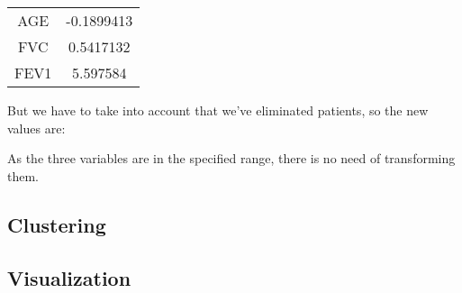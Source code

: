 \begin{center}
\begin{tabular}{| c | c |}
  \hline
  AGE & -0.1899413 \\
  FVC & 0.5417132 \\
  FEV1 & 5.597584 \\
  \hline
\end{tabular}
\end{center}

But we have to take into account that we've eliminated  patients, so the
new values are:


As the three variables are in the specified range, there is no need of
transforming them.






\subsection{Clustering}
\subsection{Visualization}
